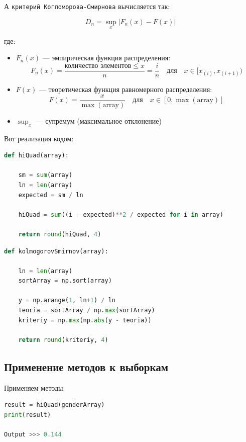 \documentclass[14pt]{extreport}
\begin{document}
	А \texttt{критерий Когломорова-Смирнова} вычисляется так:
	
	\[
		D_n = \sup_x |F_n(x) - F(x)|
	\] 
	
	где:
	\begin{itemize}
		\item $F_n(x)$ --- эмпирическая функция распределения:
		\[
			F_n(x) = \frac{\text{количество элементов} \leq x}{n} = \frac{i}{n} \quad \text{для} \quad x \in [x_{(i)}, x_{(i+1)})
		\] 
		
		\item $F(x)$ --- теоретическая функция равномерного распределения:
		\[
			F(x) = \frac{x}{\max(\text{array})} \quad \text{для} \quad x \in [0, \max(\text{array})]
		\] 
		
		\item $\sup_x$ --- супремум (максимальное отклонение)
	\end{itemize}
	
	Вот реализация кодом:
	
	\begin{lstlisting}[language=python, caption=Расчет хи-квадрат]
def hiQuad(array):
	
	sm = sum(array)
	ln = len(array)
	expected = sm / ln
	
	hiQuad = sum((i - expected)**2 / expected for i in array)   
	
	return round(hiQuad, 4)
\end{lstlisting}
	
	\begin{lstlisting}[language=python, caption=Расчет критерия Когломорова-Смирнова]
def kolmogorovSmirnov(array):
	
	ln = len(array)
	sortArray = np.sort(array)
	
	y = np.arange(1, ln+1) / ln
	teoria = sortArray / np.max(sortArray)
	kriteriy = np.max(np.abs(y - teoria))
	
	return round(kriteriy, 4)
\end{lstlisting}
	
	\subsection{Применение методов к выборкам}
	
	Применяем методы:
	
	\begin{lstlisting}[language=python, caption=Применение метода к гендерам]
result = hiQuad(genderArray)
print(result)

Output >>> 0.144
\end{lstlisting}
	
\end{document}
